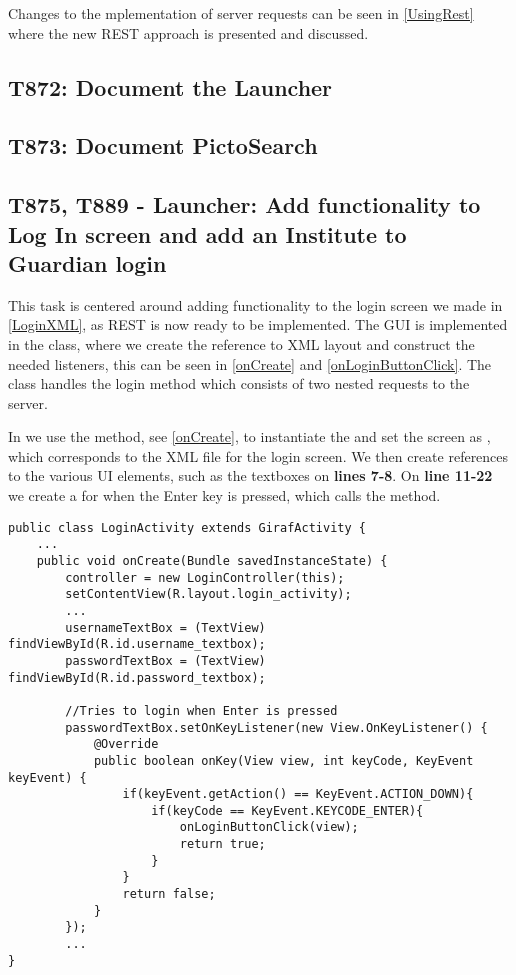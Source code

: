 Changes to the mplementation of server requests can be seen in
\autoref{UsingRest} where the new REST approach is presented and discussed.

\subsection{T872: Document the Launcher}

\subsection{T873: Document PictoSearch}

\subsection{T875, T889 - Launcher: Add functionality to Log In screen and add an
Institute to Guardian login}

This task is centered around adding functionality to the login screen we made
in \autoref{LoginXML}, as REST is now ready to be implemented. The GUI is
implemented in the  class, where we create the reference
to XML layout and construct the needed listeners, this can be seen in
\autoref{onCreate} and \autoref{onLoginButtonClick}. The 
class handles the login method which consists of two nested requests to the
server.\nl

In  we use the  method, see
\autoref{onCreate}, to instantiate the  and set the
screen as , which corresponds to the XML
file for the login screen. We then create references to the various UI elements,
such as the textboxes on \textbf{lines 7-8}. On \textbf{line 11-22} we create a
 for when the Enter key is pressed, which calls the
 method.\nl

\begin{minipage}[H]{\linewidth}
\begin{lstlisting}[caption = ???, label = onCreate] 
public class LoginActivity extends GirafActivity {
	...
	public void onCreate(Bundle savedInstanceState) {
		controller = new LoginController(this);
    	setContentView(R.layout.login_activity);
		...
        usernameTextBox = (TextView) findViewById(R.id.username_textbox);
        passwordTextBox = (TextView) findViewById(R.id.password_textbox);
        
        //Tries to login when Enter is pressed
        passwordTextBox.setOnKeyListener(new View.OnKeyListener() {
            @Override
            public boolean onKey(View view, int keyCode, KeyEvent keyEvent) {
                if(keyEvent.getAction() == KeyEvent.ACTION_DOWN){
                    if(keyCode == KeyEvent.KEYCODE_ENTER){
                        onLoginButtonClick(view);
                        return true;
                    }
                }
                return false;
            }
        });
        ...
}
\end{lstlisting}
\end{minipage}

